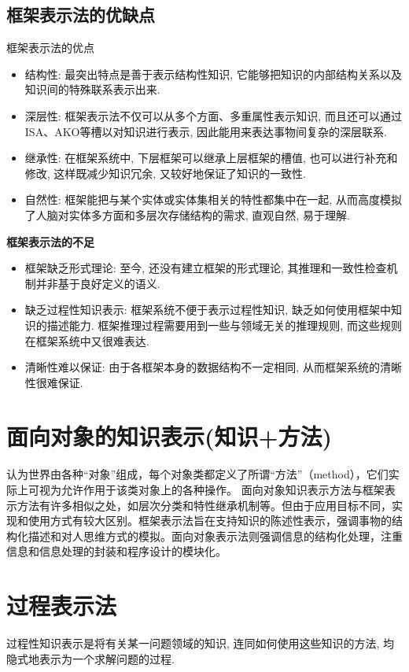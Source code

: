 \subsection{框架表示法的优缺点}
框架表示法的优点
\begin{itemize}
\item 结构性: 最突出特点是善于表示结构性知识, 它能够把知识的内部结构关系以及知识间的特殊联系表示出来.
\item 深层性: 框架表示法不仅可以从多个方面、多重属性表示知识, 而且还可以通过ISA、AKO等槽以对知识进行表示, 因此能用来表达事物间复杂的深层联系.
\item 继承性: 在框架系统中, 下层框架可以继承上层框架的槽值, 也可以进行补充和修改, 这样既减少知识冗余, 又较好地保证了知识的一致性.
\item 自然性: 框架能把与某个实体或实体集相关的特性都集中在一起, 从而高度模拟了人脑对实体多方面和多层次存储结构的需求, 直观自然, 易于理解.
\end{itemize}

\indent\textbf{框架表示法的不足}
\begin{itemize}
\item 框架缺乏形式理论: 至今, 还没有建立框架的形式理论, 其推理和一致性检查机制并非基于良好定义的语义.
\item 缺乏过程性知识表示: 框架系统不便于表示过程性知识, 缺乏如何使用框架中知识的描述能力. 框架推理过程需要用到一些与领域无关的推理规则, 而这些规则在框架系统中又很难表达.
\item 清晰性难以保证: 由于各框架本身的数据结构不一定相同, 从而框架系统的清晰性很难保证.
\end{itemize}
\section{面向对象的知识表示(知识+方法)}
认为世界由各种“对象”组成，每个对象类都定义了所谓“方法”（method），它们实际上可视为允许作用于该类对象上的各种操作。
面向对象知识表示方法与框架表示方法有许多相似之处，如层次分类和特性继承机制等。但由于应用目标不同，实现和使用方式有较大区别。框架表示法旨在支持知识的陈述性表示，强调事物的结构化描述和对人思维方式的模拟。面向对象表示法则强调信息的结构化处理，注重信息和信息处理的封装和程序设计的模块化。
\section{过程表示法}
    过程性知识表示是将有关某一问题领域的知识, 连同如何使用这些知识的方法, 均隐式地表示为一个求解问题的过程.
%
%
%

